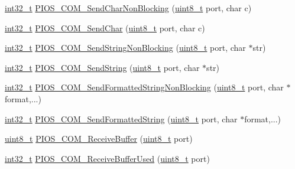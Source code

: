 \begin{DoxyCompactItemize}
\item 
\hyperlink{group___n_a_m_e_gafd12020da5a235dfcf0c3c748fb5baed}{int32\-\_\-t} \hyperlink{group___p_i_o_s___c_o_m_ga7dad1ac00c365599066ce126105aac47}{P\-I\-O\-S\-\_\-\-C\-O\-M\-\_\-\-Send\-Char\-Non\-Blocking} (\hyperlink{stdint_8h_aba7bc1797add20fe3efdf37ced1182c5}{uint8\-\_\-t} port, char c)
\item 
\hyperlink{group___n_a_m_e_gafd12020da5a235dfcf0c3c748fb5baed}{int32\-\_\-t} \hyperlink{group___p_i_o_s___c_o_m_ga8ca1ebe53ef9785e9712f03863e8cf11}{P\-I\-O\-S\-\_\-\-C\-O\-M\-\_\-\-Send\-Char} (\hyperlink{stdint_8h_aba7bc1797add20fe3efdf37ced1182c5}{uint8\-\_\-t} port, char c)
\item 
\hyperlink{group___n_a_m_e_gafd12020da5a235dfcf0c3c748fb5baed}{int32\-\_\-t} \hyperlink{group___p_i_o_s___c_o_m_gac9dcead39d37762316fcac90de7851d8}{P\-I\-O\-S\-\_\-\-C\-O\-M\-\_\-\-Send\-String\-Non\-Blocking} (\hyperlink{stdint_8h_aba7bc1797add20fe3efdf37ced1182c5}{uint8\-\_\-t} port, char $\ast$str)
\item 
\hyperlink{group___n_a_m_e_gafd12020da5a235dfcf0c3c748fb5baed}{int32\-\_\-t} \hyperlink{group___p_i_o_s___c_o_m_ga80aa12cb0dbb96ed744fec80ff420668}{P\-I\-O\-S\-\_\-\-C\-O\-M\-\_\-\-Send\-String} (\hyperlink{stdint_8h_aba7bc1797add20fe3efdf37ced1182c5}{uint8\-\_\-t} port, char $\ast$str)
\item 
\hyperlink{group___n_a_m_e_gafd12020da5a235dfcf0c3c748fb5baed}{int32\-\_\-t} \hyperlink{group___p_i_o_s___c_o_m_ga6d877cf311a9cddb699cf5cd171a3bbe}{P\-I\-O\-S\-\_\-\-C\-O\-M\-\_\-\-Send\-Formatted\-String\-Non\-Blocking} (\hyperlink{stdint_8h_aba7bc1797add20fe3efdf37ced1182c5}{uint8\-\_\-t} port, char $\ast$format,...)
\item 
\hyperlink{group___n_a_m_e_gafd12020da5a235dfcf0c3c748fb5baed}{int32\-\_\-t} \hyperlink{group___p_i_o_s___c_o_m_ga0c3dd4d3af0fe93223abf33c0281a405}{P\-I\-O\-S\-\_\-\-C\-O\-M\-\_\-\-Send\-Formatted\-String} (\hyperlink{stdint_8h_aba7bc1797add20fe3efdf37ced1182c5}{uint8\-\_\-t} port, char $\ast$format,...)
\item 
\hyperlink{stdint_8h_aba7bc1797add20fe3efdf37ced1182c5}{uint8\-\_\-t} \hyperlink{group___p_i_o_s___c_o_m_ga06c9dc70f8617ce0126f7626079fa59d}{P\-I\-O\-S\-\_\-\-C\-O\-M\-\_\-\-Receive\-Buffer} (\hyperlink{stdint_8h_aba7bc1797add20fe3efdf37ced1182c5}{uint8\-\_\-t} port)
\item 
\hyperlink{group___n_a_m_e_gafd12020da5a235dfcf0c3c748fb5baed}{int32\-\_\-t} \hyperlink{group___p_i_o_s___c_o_m_ga63c3fec796bf5ede2a297a8d48d59e24}{P\-I\-O\-S\-\_\-\-C\-O\-M\-\_\-\-Receive\-Buffer\-Used} (\hyperlink{stdint_8h_aba7bc1797add20fe3efdf37ced1182c5}{uint8\-\_\-t} port)
\end{DoxyCompactItemize}
